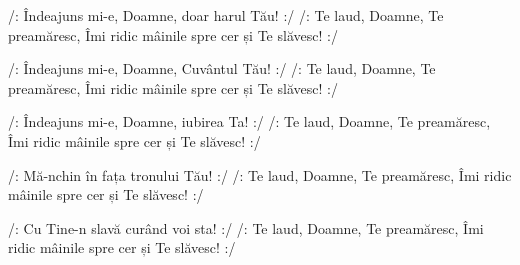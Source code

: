 \beginverse
/: Îndeajuns mi-e, Doamne, doar harul Tău! :/
/: Te laud, Doamne, Te preamăresc,
Îmi ridic mâinile spre cer și Te slăvesc! :/
\endverse

\beginverse
/: Îndeajuns mi-e, Doamne, Cuvântul Tău! :/
/: Te laud, Doamne, Te preamăresc,
Îmi ridic mâinile spre cer și Te slăvesc! :/
\endverse

\beginverse
/: Îndeajuns mi-e, Doamne, iubirea Ta! :/
/: Te laud, Doamne, Te preamăresc,
Îmi ridic mâinile spre cer și Te slăvesc! :/
\endverse

\beginverse
/: Mă-nchin în fața tronului Tău! :/
/: Te laud, Doamne, Te preamăresc,
Îmi ridic mâinile spre cer și Te slăvesc! :/
\endverse

\beginverse
/: Cu Tine-n slavă curând voi sta! :/
/: Te laud, Doamne, Te preamăresc,
Îmi ridic mâinile spre cer și Te slăvesc! :/
\endverse
\endsong